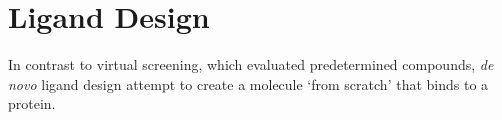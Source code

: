 \section{Ligand Design} 

In contrast to virtual screening, which evaluated predetermined compounds, \textit{de novo} ligand design attempt to create a molecule `from scratch' that binds to a protein.
